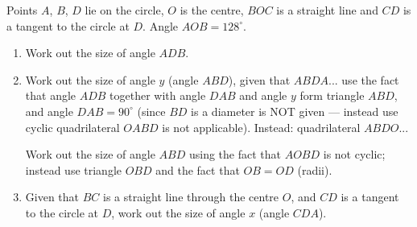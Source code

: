 \documentclass[11pt]{article}
\begin{document}
\begin{question}
\begin{center}
\begin{tikzpicture}[scale=2.1]
\end{tikzpicture}
\end{center}

\noindent Points $A$, $B$, $D$ lie on the circle, $O$ is the centre, $BOC$ is a straight line and $CD$ is a tangent to the circle at $D$. Angle $AOB = 128^\circ$.

\begin{enumerate}
    \item[(a)] Work out the size of angle $ADB$.
    \vspace{3.5cm}

    \item[(b)] Work out the size of angle $y$ (angle $ABD$), given that $ABDA$... use the fact that angle $ADB$ together with angle $DAB$ and angle $y$ form triangle $ABD$, and angle $DAB = 90^\circ$ (since $BD$ is a diameter is NOT given — instead use cyclic quadrilateral $OABD$ is not applicable). Instead: quadrilateral $ABDO$... 
    
    Work out the size of angle $ABD$ using the fact that $AOBD$ is not cyclic; instead use triangle $OBD$ and the fact that $OB = OD$ (radii).
    \vspace{4cm}

    \item[(c)] Given that $BC$ is a straight line through the centre $O$, and $CD$ is a tangent to the circle at $D$, work out the size of angle $x$ (angle $CDA$).
    \vspace{4cm}
\end{enumerate}
\end{question}
\end{document}
